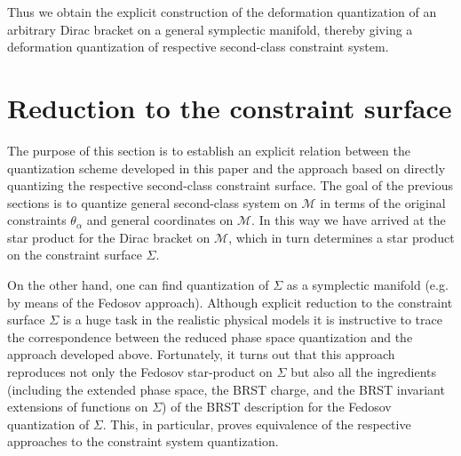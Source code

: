 \documentclass[a4paper,11pt]{amsart}
\numberwithin{thm}{section} %
\numberwithin{equation}{section} %
\numberwithin{figure}{section} %
\renewcommand{\:}{{\rm\, :\,}}
\def\manM{{\mathcal M}}
\begin{document}
Thus we obtain the explicit construction of the deformation quantization
of an arbitrary Dirac bracket on a general symplectic manifold,
thereby giving a deformation quantization of respective second-class
constraint system.


\section{Reduction to the constraint surface}\label{sec:reduction}
The purpose of this section is to establish an explicit relation
between the quantization scheme developed in this paper and
the approach based on directly quantizing the respective
second-class constraint surface.  The goal of the previous sections is
to quantize general second-class system on $\manM$ in terms of
the original constraints $\theta_\alpha$ and general coordinates on
$\manM$.  In this way we have arrived at the star product for the
Dirac bracket on $\manM$, which in turn determines a star product on
the constraint surface $\Sigma$.

On the other hand, one can find quantization of $\Sigma$ as a
symplectic manifold (e.g. by means of the Fedosov approach).  Although
explicit reduction to the constraint surface $\Sigma$ is a huge task
in the realistic physical models it is instructive to trace
the correspondence between the reduced phase space quantization and the
approach developed above.  Fortunately, it turns out that this approach
reproduces not only the Fedosov star-product on $\Sigma$ but also
all the ingredients (including the extended phase space, the BRST charge,
and the BRST invariant extensions of functions on $\Sigma$)
of the BRST description for the Fedosov
quantization of $\Sigma$.  This, in particular, proves equivalence of
the respective approaches to the constraint system quantization.
\end{document}
